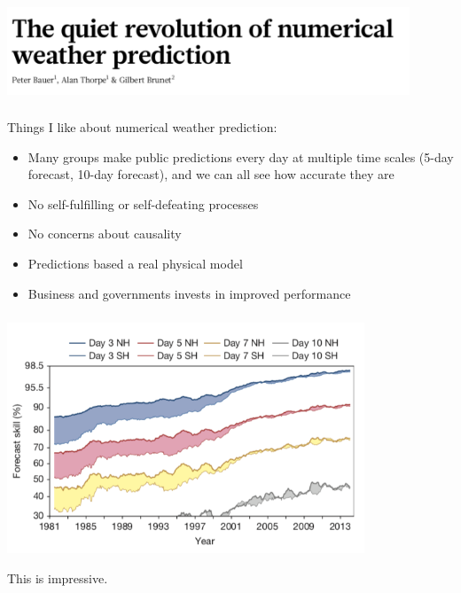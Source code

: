 \documentclass[aspectratio=169]{beamer}
\begin{document}
\begin{frame}
\frametitle{}

\begin{center}
\includegraphics[width = 0.9\textwidth]{figures/bauer_quiet_2015_title}
\end{center}

\end{frame}
\begin{frame}
\frametitle{}

Things I like about numerical weather prediction:
\begin{itemize}
\item Many groups make public predictions every day at multiple time scales (5-day forecast, 10-day forecast), and we can all see how accurate they are
\pause
\item No self-fulfilling or self-defeating processes 
\pause
\item No concerns about causality
\pause
\item Predictions based a real physical model
\pause
\item Business and governments invests in improved performance
\end{itemize}

\end{frame}
\begin{frame}
\frametitle{}

\begin{center}
\includegraphics[width = 0.8\textwidth]{figures/bauer_quiet_2015_fig1}
\end{center}

\vfill
This is impressive.

\end{frame}
\end{document}
